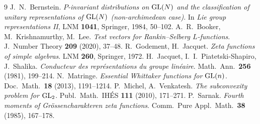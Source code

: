 \begin{thebibliography}{9}
 J.~N.~Bernstein.
  \emph{$P$-invariant distributions on $\mathrm{GL}(N)$ and the classification of
  unitary representations of $\mathrm{GL}(N)$ (non-archimedean case)}. In
  \emph{Lie group representations II}, LNM \textbf{1041}, Springer, 1984,
  50--102.
 A.~R.~Booker, M.~Krishnamurthy, M.~Lee.
  \emph{Test vectors for Rankin--Selberg $L$-functions}.
  J.\ Number Theory \textbf{209} (2020), 37--48.
 R.~Godement, H.~Jacquet.
  \emph{Zeta functions of simple algebras}. LNM \textbf{260}, Springer, 1972.
 H.~Jacquet, I.~I.~Piatetski-Shapiro, J.~Shalika.
  \emph{Conducteur des repr\'esentations du groupe lin\'eaire}.
  Math.\ Ann.\ \textbf{256} (1981), 199--214.
 N.~Matringe.
  \emph{Essential Whittaker functions for $\mathrm{GL}(n)$}.
  Doc.\ Math.\ \textbf{18} (2013), 1191--1214.
 P.~Michel, A.~Venkatesh.
  \emph{The subconvexity problem for $\mathrm{GL}_2$}.
  Publ.\ Math.\ IH\'ES \textbf{111} (2010), 171--271.
 P.~Sarnak.
  \emph{Fourth moments of Gr\"ossencharakteren zeta functions}.
  Comm.\ Pure Appl.\ Math.\ \textbf{38} (1985), 167--178.
\end{thebibliography}

\endgroup
